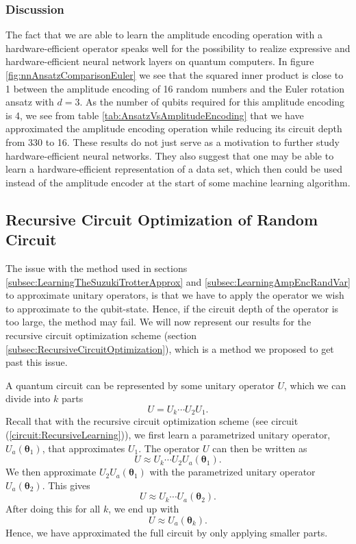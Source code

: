 \subsubsection{Discussion}
The fact that we are able to learn the amplitude encoding operation with a hardware-efficient operator speaks well for the possibility to realize expressive and hardware-efficient neural network layers on quantum computers. In figure \ref{fig:nnAnsatzComparisonEuler} we see that the squared inner product is close to 1 between the amplitude encoding of 16 random numbers and the Euler rotation ansatz with $d = 3$. As the number of qubits required for this amplitude encoding is 4, we see from table \ref{tab:AnsatzVsAmplitudeEncoding} that we have approximated the amplitude encoding operation while reducing its circuit depth from 330 to 16.\newline 
These results do not just serve as a motivation to further study hardware-efficient neural networks. They also suggest that one may be able to learn a hardware-efficient representation of a data set, which then could be used instead of the amplitude encoder at the start of some machine learning algorithm.

\subsection{Recursive Circuit Optimization of Random Circuit}
\label{subsec:RecurisveCircuitOptRandCirc}

The issue with the method used in sections \ref{subsec:LearningTheSuzukiTrotterApprox} and \ref{subsec:LearningAmpEncRandVar} to approximate unitary operators, is that we have to apply the operator we wish to approximate to the qubit-state. Hence, if the circuit depth of the operator is too large, the method may fail. We will now represent our results for the recursive circuit optimization scheme (section \ref{subsec:RecursiveCircuitOptimization}), which is a method we proposed to get past this issue.

A quantum circuit can be represented by some unitary operator $U$, which we can divide into $k$ parts
$$U = U_k \cdots U_2 U_1.$$
Recall that with the recursive circuit optimization scheme (see circuit (\ref{circuit:RecursiveLearning})), we first learn a parametrized unitary operator, $U_a(\boldsymbol{\theta}_1)$, that approximates $U_1$.
The operator $U$ can then be written as
$$U \approx U_k \cdots U_2U_a(\boldsymbol{\theta}_1).$$
We then approximate $U_2U_a(\boldsymbol{\theta}_1)$ with the parametrized unitary operator $U_a(\boldsymbol{\theta}_2)$.
This gives
$$ U \approx U_k \cdots U_a(\boldsymbol{\theta}_2).$$
After doing this for all $k$, we end up with
$$U \approx U_a(\boldsymbol{\theta}_k).$$
Hence, we have approximated the full circuit by only applying smaller parts.


